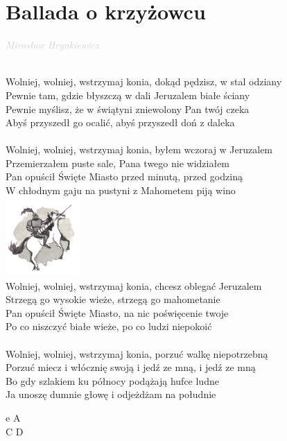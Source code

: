 \documentclass[a5paper, 10pt]{book}
\begin{document}
\section{Ballada o krzyżowcu}\textcolor{lightgray}{\textit{Mirosław Hrynkiewicz}}\\~\\
\begin{minipage}[t]{0.85\textwidth}
  Wolniej, wolniej, wstrzymaj konia, dokąd pędzisz, w stal odziany\\
  Pewnie tam, gdzie błyszczą w dali Jeruzalem białe ściany\\
  Pewnie myślisz, że w świątyni zniewolony Pan twój czeka\\
  Abyś przyszedł go ocalić, abyś przyszedł doń z daleka\\
  \\
  Wolniej, wolniej, wstrzymaj konia, byłem wczoraj w Jeruzalem\\
  Przemierzałem puste sale, Pana twego nie widziałem\\
  Pan opuścił Święte Miasto przed minutą, przed godziną\\
  W chłodnym gaju na pustyni z Mahometem piją wino\\
  \hspace*{10cm}\includegraphics[height=3cm]{images/ballada_o_krzyzowcu.png}\vspace*{-3cm}\\

  Wolniej, wolniej, wstrzymaj konia, chcesz oblegać Jeruzalem\\
  Strzegą go wysokie wieże, strzegą go mahometanie\\
  Pan opuścił Święte Miasto, na nic poświęcenie twoje\\
  Po co niszczyć białe wieże, po co ludzi niepokoić\\
  \\
  Wolniej, wolniej, wstrzymaj konia, porzuć walkę niepotrzebną\\
  Porzuć miecz i włócznię swoją i jedź ze mną, i jedź ze mną\\
  Bo gdy szlakiem ku północy podążają hufce ludne\\
  Ja unoszę dumnie głowę i odjeżdżam na południe\\
\end{minipage}
\begin{minipage}[t]{0.2\textwidth}
  e A\\C D\\
\end{minipage}
\end{document}

